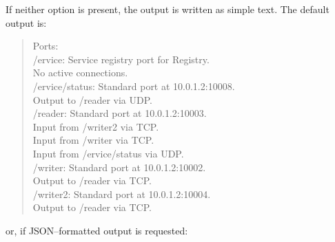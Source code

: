 If neither option is present, the output is written as simple text.
The default output is:
\begin{quote}
Ports:\\
\settowidth{\utilLen}{Por}%
/\textdollar{}ervice: Service registry port for \squote{}Registry\squote{}.\\
\hspace*{\utilLen}No active connections.\\
/\textdollar{}ervice/status: Standard port at 10.0.1.2:10008.\\
\hspace*{\utilLen}Output to /reader via UDP.\\
/reader: Standard port at 10.0.1.2:10003.\\
\hspace*{\utilLen}Input from /writer2 via TCP.\\
\hspace*{\utilLen}Input from /writer via TCP.\\
\hspace*{\utilLen}Input from /\textdollar{}ervice/status via UDP.\\
/writer: Standard port at 10.0.1.2:10002.\\
\hspace*{\utilLen}Output to /reader via TCP.\\
/writer2: Standard port at 10.0.1.2:10004.\\
\hspace*{\utilLen}Output to /reader via TCP.
\end{quote}
or, if JSON--formatted output is requested:
